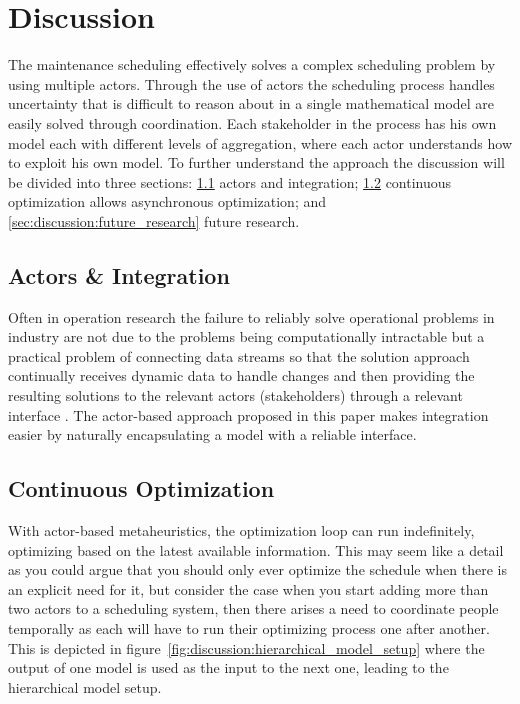 \section{Discussion}
\label{sec:4-discussion}
The maintenance scheduling effectively solves a complex scheduling problem by
using multiple actors. Through the use of actors the scheduling process handles
uncertainty that is difficult to reason about in a single mathematical model are
easily solved through coordination. Each stakeholder in the process has his own
model each with different levels of aggregation, where each actor understands 
how to exploit his own model.
To further understand the approach
the discussion will be divided into three sections: \ref{sec:discussion:actors_and_integration} 
actors and integration;
\ref{sec:discussion:continuous_optimization} continuous optimization allows asynchronous optimization; 
and \ref{sec:discussion:future_research} future research.

\subsection{Actors \& Integration}
\label{sec:discussion:actors_and_integration}
Often in operation research the failure to reliably solve operational problems in 
industry are not due to the problems being computationally intractable \cite{gendreauHandbookMetaheuristics2019} but a
practical problem of connecting data streams so that the solution approach continually
receives dynamic data to handle changes and then providing the resulting solutions
to the relevant actors (stakeholders) through a relevant interface \cite{meignanReviewTaxonomyInteractive2015}.
The actor-based approach proposed in this paper makes integration easier by
naturally encapsulating a model with a reliable interface. 

\subsection{Continuous Optimization}
\label{sec:discussion:continuous_optimization}
With actor-based metaheuristics, the optimization loop can run indefinitely,
optimizing based on the latest available information. This may seem like a
detail as you could argue that you should only ever optimize the schedule
when there is an explicit need for it, but consider the case when you start
adding more than two actors to a scheduling system, then there arises a need
to coordinate people temporally as each will have to run their optimizing
process one after another. This is depicted in figure~\ref{fig:discussion:hierarchical_model_setup}
where the output of one model is used as the input to the next one, leading
to the hierarchical model setup.

